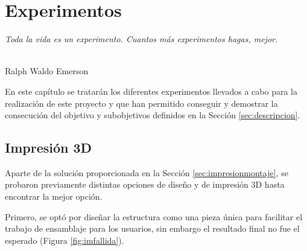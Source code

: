 \chapter{Experimentos}
\label{cap:capitulo7}

\begin{flushright}
\begin{minipage}[]{10cm}
\emph{Toda la vida es un experimento. Cuantos más experimentos hagas, mejor.}\\
\end{minipage}\\

Ralph Waldo Emerson\\
\end{flushright}

\vspace{1cm}

\setcounter{footnote}{132} %

En este capítulo se tratarán los diferentes experimentos llevados a cabo para la realización de este proyecto y que han permitido conseguir y demostrar la consecución del objetivo y subobjetivos definidos en la Sección \ref{sec:descripcion}.

\section{Impresión 3D}
\label{sec:expimpresion3d}
Aparte de la solución proporcionada en la Sección \ref{sec:impresionmontaje}, se probaron previamente distintas opciones de diseño y de impresión 3D hasta encontrar la mejor opción.

Primero, se optó por diseñar la estructura como una pieza única para facilitar el trabajo de ensamblaje para los usuarios, sin embargo el resultado final no fue el esperado (Figura \ref{fig:imfallida}). 

